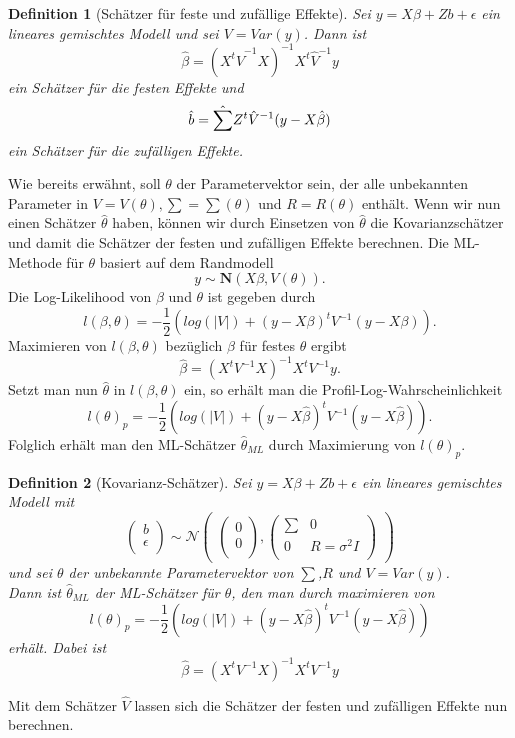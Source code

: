 \documentclass[%
thesis=student,%
coverpage=false,%
titlepage=false,%
headmarks=true, %
german,%
font=libertine, %
math=newpxtx, %
BCOR=5mm,%
coverBCOR=11mm%
]{tumbook}
\theoremstyle{break}
\newtheorem{definition}{Definition}[section]
\begin{document}
\begin{definition}[Schätzer für feste und zufällige Effekte]
	Sei $y = X\beta + Zb + \epsilon$ ein lineares gemischtes Modell und sei $V = Var(y)$.
	Dann ist $$\hat{\beta} = (X^t \hat{V}^{-1}X)^{-1}X^t \hat{V}^{-1}y$$ ein Schätzer für die festen Effekte und $$ \hat{b} = \hat{\tiny\sum} Z^t\hat{V}^{-1}(y-X\hat{\beta})$$ ein Schätzer für die zufälligen Effekte.
\end{definition}

Wie bereits erwähnt, soll $\theta$ der Parametervektor sein, der alle unbekannten Parameter in $V= V(\theta), \sum = \sum(\theta)$ und $R = R(\theta)$ enthält. Wenn wir nun einen Schätzer $\hat{\theta}$ haben, können wir durch Einsetzen von $\hat{\theta}$ die Kovarianzschätzer und damit die Schätzer der festen und zufälligen Effekte berechnen. 
Die ML-Methode für $\theta$ basiert auf dem Randmodell 
$$y \sim \mathbf{N}(X\beta,V(\theta)).$$
Die Log-Likelihood von $\beta$ und $\theta$ ist gegeben durch
$$l(\beta,\theta) = - \frac{1}{2} (log(|V|)+(y-X\beta)^tV^{-1}(y-X\beta)).$$
Maximieren von $l(\beta,\theta)$ bezüglich $\beta$ für festes $\theta$ ergibt 
$$ \hat{\beta} = (X^tV^{-1}X)^{-1}X^tV^{-1}y.$$
Setzt man nun $\hat{\theta}$ in $l(\beta,\theta)$ ein, so erhält man die Profil-Log-Wahrscheinlichkeit 
$$ l(\theta)_p = - \frac{1}{2} (log(|V|)+(y-X\hat{\beta})^tV^{-1}(y-X\hat{\beta})).$$
Folglich erhält man den ML-Schätzer $\hat{\theta}_{ML}$ durch Maximierung von $l(\theta)_p$. 
\begin{definition}[Kovarianz-Schätzer]
	Sei $y = X\beta + Zb + \epsilon $ ein lineares gemischtes Modell mit $$\begin{pmatrix}
		b \\
		\epsilon \\
	\end{pmatrix}
	\sim
	\mathcal{N}
	\begin{pmatrix}
		\begin{pmatrix}
			
			0 \\
			0 \\
		\end{pmatrix},
		\begin{pmatrix}
			\sum & 0 \\
			0 & R = \sigma^2I \\
		\end{pmatrix}
	\end{pmatrix}$$ und sei $\theta$ der unbekannte Parametervektor von $\sum$,$R$ und $V=Var(y)$. \\
	Dann ist $\hat{\theta}_{ML}$ der ML-Schätzer für $\theta$, den man durch maximieren von $$  l(\theta)_p = - \frac{1}{2} (log(|V|)+(y-X\hat{\beta})^tV^{-1}(y-X\hat{\beta})) $$erhält.
	Dabei ist $$ \hat{\beta} = (X^tV^{-1}X)^{-1}X^tV^{-1}y$$
\end{definition} \noindent
 Mit dem Schätzer $\hat{V}$ lassen sich die Schätzer der festen und zufälligen Effekte nun berechnen.
 
\end{document}
